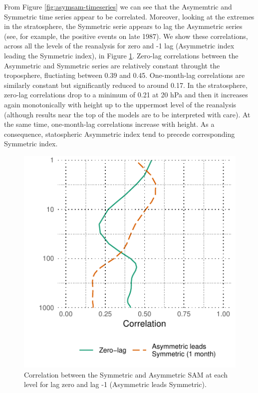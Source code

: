 \documentclass[twocol]{ametsocV5}
\begin{document}
From Figure \ref{fig:asymsam-timeseries} we can see that the Asymemtric
and Symmetric time series appear to be correlated. Moreover, looking at
the extremes in the stratosphere, the Symmetric serie appears to lag the
Asymmetric series (see, for example, the positive events on late 1987).
We show these correlations, across all the levels of the reanalysis for
zero and -1 lag (Asymmetric index leading the Symmetric index), in
Figure \ref{fig:cor-lev}. Zero-lag correlations between the Asymmetric
and Symmetric series are relatively constant throught the troposphere,
fluctiating between 0.39 and 0.45. One-month-lag correlations are
similarly constant but significantly reduced to around 0.17. In the
stratosphere, zero-lag correlations drop to a minimum of 0.21 at 20 hPa
and then it increases again monotonically with height up to the
uppermost level of the reanalysis (although results near the top of the
models are to be interpreted with care). At the same time, one-month-lag
correlations increase with height. As a consequence, statospheric
Asymmetric index tend to precede corresponding Symmetric index.

\begin{figure}
\includegraphics{cor-lev-1} \caption[Correlation between the Symmetric and Asymmetric SAM at each level for lag zero and lag -1 (Asymmetric leads Symmetric)]{Correlation between the Symmetric and Asymmetric SAM at each level for lag zero and lag -1 (Asymmetric leads Symmetric).}\label{fig:cor-lev}
\end{figure}
\end{document}
